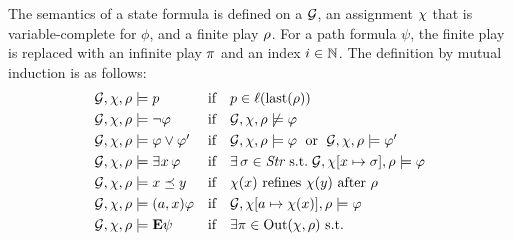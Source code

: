 \begin{definition}%
\label{def-SLi-semantics}
The semantics of a state formula is defined on a \CGS $\CGS$, an
assignment  $\chi$ that is variable-complete for $\phi$, and a
finite play $\rho$. For a path formula $\psi$, the finite play is
replaced with an infinite play $\pi$ and an index $i\in\mathbb N$. The
definition by mutual induction is as follows:
\[
\begin{array}{lcl}
 \CGS,\assign,\fplay\modelsSL p & \text{if} & p\in\val(\last(\fplay))\\[3pt]
 \CGS,\assign,\fplay\modelsSL \neg\phi & \text{if} &
  \CGS,\assign,\fplay\not\modelsSL\phi\\[3pt]
 \CGS,\assign,\fplay\modelsSL \phi\ou\phi' & \text{if} &
  \CGS,\assign,\fplay\modelsSL\phi \;\text{ or }\;
  \CGS,\assign,\fplay\modelsSL\phi' \\[3pt]
 \CGS,\assign,\fplay\modelsSL\Estratnd\phi  & \text{if} & 
\exists\,   \strat\in\setstratnd \;\text{s.t.} \;
                                                          \CGS,\assign[\var\mapsto\strat],\fplay\modelsSL
                                                          \phi\\[3pt]
   \CGS,\assign,\fplay\modelsSL \var\refines\varb & \text{if} &
                                                              \assign(\var)
                                                              \mbox{
                                                              refines
                                                                }\assign(\varb)
  \mbox{ after }\fplay\\[3pt]
 \CGS,\assign,\fplay\modelsSL \bind{\var}\phi & \text{if} &
 \CGS,\assign[\ag\mapsto\assign(\var)],\fplay\modelsSL \phi\\[3pt]  
 \CGS,\assign,\fplay\modelsSL \Eout\psi & \text{if} & \exists\iplay \in
                                                         \out(\assign,\fplay)
                                                         \text{ s.t. }
  \\

\end{array}\]
\end{definition}
